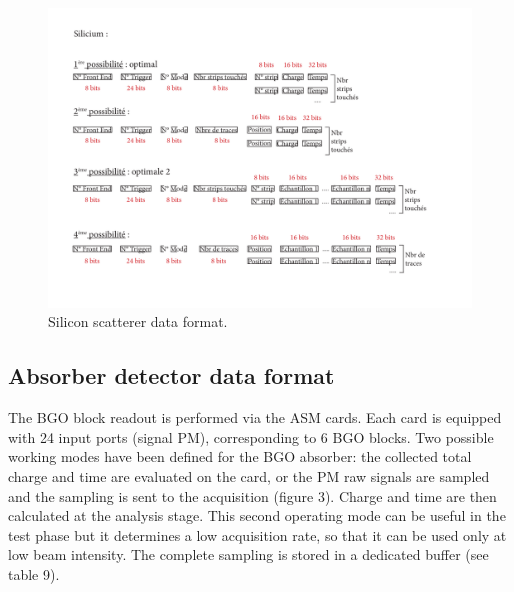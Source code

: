 	\begin{figure} [hbtp]
	\centering
	\caption{Silicon scatterer data format.}
	\includegraphics[width=1.3\textwidth]{03_GraphicFiles/appendixA_dataFormat/2015_05_14_Format_datas_acquisition_Si.pdf}
	\end{figure}

\clearpage
\newpage
\subsection{Absorber detector data format}
The BGO block readout is performed via the ASM cards. Each card is equipped with 24 input ports (signal PM), corresponding to 6 BGO blocks. Two possible working modes have been defined for the BGO absorber: the collected total charge and time are evaluated on the card, or the PM raw signals are sampled and the sampling is sent to the acquisition (figure 3). Charge and time are then calculated at the analysis stage. This second operating mode can be useful in the test phase but it determines a low acquisition rate, so that it can be used only at low beam intensity.\newline
The complete sampling is stored in a dedicated buffer (see table 9).

